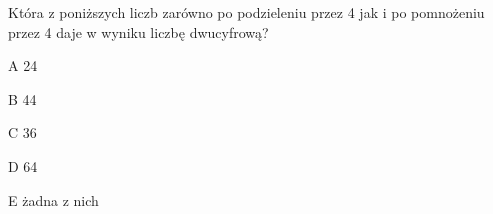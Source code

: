 \begin{tresc}
Która z poniższych liczb zarówno po podzieleniu przez 4 jak i po pomnożeniu przez 4 daje w wyniku liczbę dwucyfrową?
\end{tresc}
\begin{wariant}{A} 24 \end{wariant}
\begin{wariant}{B} 44 \end{wariant}
\begin{wariant}{C} 36 \end{wariant}
\begin{wariant}{D} 64 \end{wariant}
\begin{wariant}{E} żadna z nich \end{wariant}
